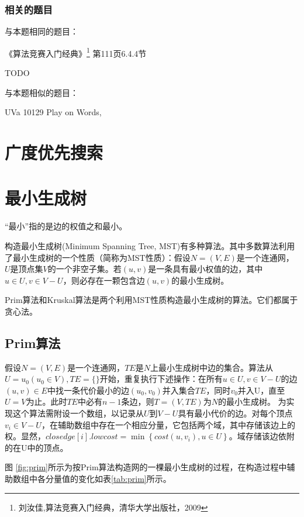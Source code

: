 \subsubsection{相关的题目}
与本题相同的题目：
\begindot
\item 《算法竞赛入门经典》\footnote{刘汝佳,算法竞赛入门经典，清华大学出版社，2009} 第111页6.4.4节
\item  TODO
\myenddot

与本题相似的题目：
\begindot
\item  UVa 10129 Play on Words, 
\myenddot


\section{广度优先搜索} %



\section{最小生成树} %
“最小”指的是边的权值之和最小。

构造最小生成树(Minimum Spanning Tree, MST)有多种算法。其中多数算法利用了最小生成树的一个性质（简称为MST性质）：假设$N=(V, E)$是一个连通网，$U$是顶点集$V$的一个非空子集。若$(u, v)$是一条具有最小权值的边，其中$u \in U, v \in V-U$，则必存在一颗包含边$(u, v)$的最小生成树。

Prim算法和Kruskal算法是两个利用MST性质构造最小生成树的算法。它们都属于贪心法。

\subsection{Prim算法}
假设$N=(V, E)$是一个连通网，$TE$是$N$上最小生成树中边的集合。算法从$U={u_0}(u_0 \in V), TE=\{\}$开始，重复执行下述操作：在所有$u \in U, v \in V-U$的边$(u, v) \in E$中找一条代价最小的边$(u_0, v_0)$并入集合$TE$，同时$v_0$并入U，直至$U=V$为止。此时$TE$中必有$n-1$条边，则$T=(V, TE)$为$N$的最小生成树。
为实现这个算法需附设一个数组，以记录从$U$到$V-U$具有最小代价的边。对每个顶点$v_i \in V-U$，在辅助数组中存在一个相应分量，它包括两个域，其中存储该边上的权。显然，$closedge[i].lowcost=\min\left\{cost(u, v_i), u \in U\right\}$。域存储该边依附的在U中的顶点。

图 \ref{fig:prim}所示为按Prim算法构造网的一棵最小生成树的过程，在构造过程中辅助数组中各分量值的变化如表\ref{tab:prim}所示。

